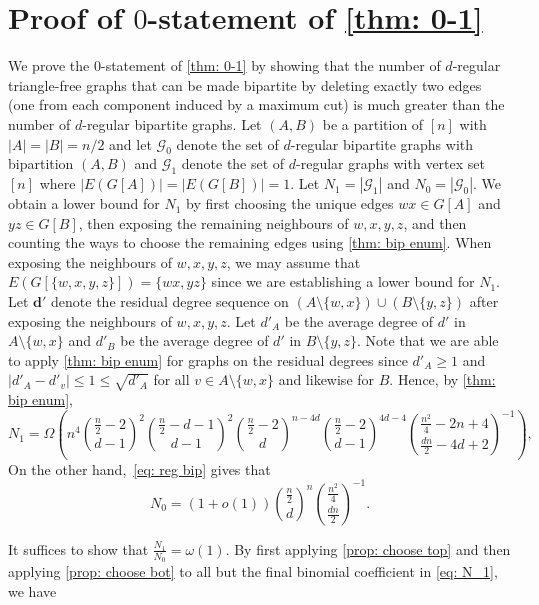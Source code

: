 \documentclass[11pt]{article}
\theoremstyle{plain}
\begin{document}
\section{Proof of $0$-statement of \cref{thm: 0-1}}\label{sec: zero}
We prove the $0$-statement of \cref{thm: 0-1} by showing that the number of $d$-regular triangle-free graphs that can be made bipartite by deleting exactly two edges (one from each component induced by a maximum cut) is much greater than the number of $d$-regular bipartite graphs.
Let $(A,B)$ be a partition of $[n]$ with $|A| = |B| = n/2$ and let $\mathcal G_0$ denote the set of $d$-regular bipartite graphs with bipartition $(A,B)$ and $\mathcal G_1$ denote the set of $d$-regular graphs with vertex set $[n]$ where $|E(G[A])| = |E(G[B])| = 1$. Let $N_1 = |\mathcal G_1|$ and $N_0 = |\mathcal G_0|$. We obtain a lower bound for $N_1$ by first choosing the unique edges $wx \in G[A]$ and $yz \in G[B]$, then exposing the remaining neighbours of $w,x,y,z$, and then counting the ways to choose the remaining edges using \cref{thm: bip enum}. When exposing the neighbours of $w,x,y,z$, we may assume that $E(G[\{w,x,y,z\}]) = \{wx, yz\}$ since we are establishing a lower bound for $N_1$. Let $\mathbf {d'}$ denote the residual degree sequence on $(A \setminus \{w,x\})\cup (B \setminus \{y,z\})$ after exposing the neighbours of $w,x,y,z$. Let $d'_A$ be the average degree of $d'$ in $A \setminus\{w,x\}$ and $d'_B$ be the average degree of $d'$ in $B \setminus \{y,z\}$. Note that we are able to apply \cref{thm: bip enum} for graphs on the residual degrees since $d'_{A} \geq1$ and $|d'_{A} - d'_v| \leq 1 \leq \sqrt{d'_{A}}$ for all $v \in A \setminus \{w,x\}$ and likewise for $B$. 
Hence, by \cref{thm: bip enum},
\begin{equation}\label{eq: N_1}
    N_1 = \Omega\left({n^4}{\frac{n}{2} - 2 \choose d-1}^2{\frac{n}{2} - d - 1 \choose d - 1}^2{\frac{n}{2} - 2 \choose d}^{n - 4d}{\frac{n}{2} - 2 \choose d-1}^{4d -4}{\frac{n^2}{4} - 2n + 4 \choose \frac{dn}{2} - 4d + 2}^{-1}\right),
\end{equation}
On the other hand,~\eqref{eq: reg bip}  gives that 
\begin{equation}\label{eq: N_0}
    N_0 = (1 + o(1)){\frac{n}{2} \choose d}^n{\frac{n^2}{4} \choose \frac{dn}{2}}^{-1}.
\end{equation}

It suffices to show that $\frac{N_1}{N_0} = \omega(1)$.
By first applying \cref{prop: choose top} and then applying \cref{prop: choose bot} to all but the final binomial coefficient in \eqref{eq: N_1}, we have 
\end{document}

